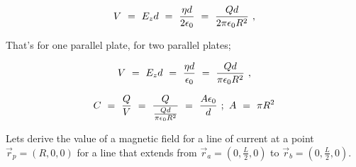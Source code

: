 \documentclass{article}
\newcounter{subsubsubsection}[subsubsection]
\begin{document}
\begin{equation} \label{eb-eq-49-1}
V \hspace{0.125cm} = \hspace{0.125cm} E_{z} d \hspace{0.125cm} = \hspace{0.125cm} \frac{\eta d}{2\epsilon_{0}} \hspace{0.125cm} = \hspace{0.125cm} \frac{Qd}{2\pi\epsilon_{0}R^2} \hspace{0.125cm} ,
\end{equation}

That's for one parallel plate, for two parallel plates;

\begin{equation} \label{eb-eq-50-1}
V \hspace{0.125cm} = \hspace{0.125cm} E_{z} d \hspace{0.125cm} = \hspace{0.125cm} \frac{\eta d}{\epsilon_{0}} \hspace{0.125cm} = \hspace{0.125cm} \frac{Qd}{\pi\epsilon_{0}R^2} \hspace{0.125cm} ,
\end{equation}

\begin{equation} \label{eb-eq-51-1}
C \hspace{0.125cm} = \hspace{0.125cm} \frac{Q}{V} \hspace{0.125cm} = \hspace{0.125cm} \frac{Q}{\frac{Qd}{\pi\epsilon_{0}R^2}} \hspace{0.125cm} = \hspace{0.125cm} \frac{A\epsilon_{0}}{d} \hspace{0.125cm} ; \hspace{0.125cm} A \hspace{0.125cm} = \hspace{0.125cm} \pi R^2 
\end{equation}


Lets derive the value of a magnetic field for a line of current at a point \begin{math} \vec{r}_p = (R, 0, 0) \end{math} for a line that extends from \begin{math} \vec{r}_a = (0, \frac{L}{2}, 0) \end{math} to \begin{math} \vec{r}_b = (0, \frac{L}{2}, 0) \end{math}.
\end{document}
